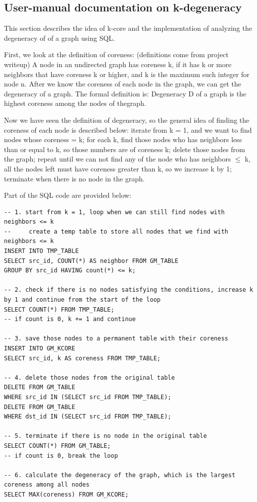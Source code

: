 \subsection{User-manual documentation on k-degeneracy}
This section describes the idea of k-core and the implementation of analyzing the degeneracy of of a graph using SQL.\par

First, we look at the definition of coreness: (definitions come from project writeup) A node in an undirected graph has coreness k, if it has k or more neighbors that have coreness k or higher, and k is the maximum such integer for node n. After we know the coreness of each node in the graph, we can get the degeneracy of a graph. The formal definition is: Degeneracy D of a graph is the highest coreness among the nodes of thegraph.\par

Now we have seen the definition of degeneracy, so the general idea of finding the coreness of each node is described below: iterate from k = 1, and we want to find nodes whose coreness = k; for each k, find those nodes who has neighbors less than or equal to k, so those numbers are of coreness k; delete those nodes from the graph; repeat until we can not find any of the node who has neighbors $\le$ k, all the nodes left must have coreness greater than k, so we increase k by 1; terminate when there is no node in the graph.\par

Part of the SQL code are provided below:\par
\begin{lstlisting}
-- 1. start from k = 1, loop when we can still find nodes with neighbors <= k
--     create a temp table to store all nodes that we find with neighbors <= k
INSERT INTO TMP_TABLE
SELECT src_id, COUNT(*) AS neighbor FROM GM_TABLE
GROUP BY src_id HAVING count(*) <= k;
                 
-- 2. check if there is no nodes satisfying the conditions, increase k by 1 and continue from the start of the loop
SELECT COUNT(*) FROM TMP_TABLE;
-- if count is 0, k += 1 and continue

-- 3. save those nodes to a permanent table with their coreness
INSERT INTO GM_KCORE
SELECT src_id, k AS coreness FROM TMP_TABLE;

-- 4. delete those nodes from the original table
DELETE FROM GM_TABLE
WHERE src_id IN (SELECT src_id FROM TMP_TABLE);
DELETE FROM GM_TABLE
WHERE dst_id IN (SELECT src_id FROM TMP_TABLE);
	
-- 5. terminate if there is no node in the original table
SELECT COUNT(*) FROM GM_TABLE;
-- if count is 0, break the loop
		
-- 6. calculate the degeneracy of the graph, which is the largest coreness among all nodes
SELECT MAX(coreness) FROM GM_KCORE;
\end{lstlisting}

